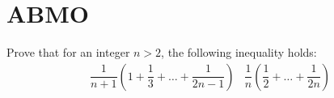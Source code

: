 \documentclass{subfile}
\begin{document}
	\section{ABMO}\label{sec:abmo}
		\begin{problem}
			Prove that for an integer $n>2$, the following inequality holds:
				\begin{align*}
					\dfrac{1}{n+1}\left(1+\dfrac{1}{3}+\ldots+\dfrac{1}{2n-1}\right)
						& \dfrac{1}{n}\left(\dfrac{1}{2}+\ldots+\dfrac{1}{2n}\right)
				\end{align*}
		\end{problem}
\end{document}
